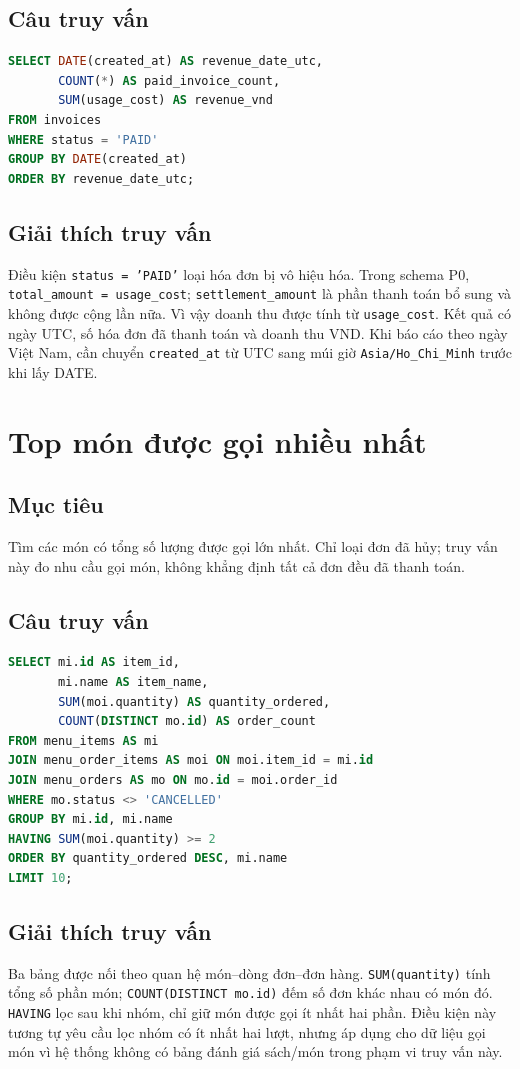 \subsection*{Câu truy vấn}
\begin{lstlisting}[language=SQL]
SELECT DATE(created_at) AS revenue_date_utc,
       COUNT(*) AS paid_invoice_count,
       SUM(usage_cost) AS revenue_vnd
FROM invoices
WHERE status = 'PAID'
GROUP BY DATE(created_at)
ORDER BY revenue_date_utc;
\end{lstlisting}

\subsection*{Giải thích truy vấn}
Điều kiện \texttt{status = 'PAID'} loại hóa đơn bị vô hiệu hóa. Trong schema P0, \texttt{total\_amount = usage\_cost}; \texttt{settlement\_amount} là phần thanh toán bổ sung và không được cộng lần nữa. Vì vậy doanh thu được tính từ \texttt{usage\_cost}. Kết quả có ngày UTC, số hóa đơn đã thanh toán và doanh thu VND. Khi báo cáo theo ngày Việt Nam, cần chuyển \texttt{created\_at} từ UTC sang múi giờ \texttt{Asia/Ho\_Chi\_Minh} trước khi lấy DATE.

\section{Top món được gọi nhiều nhất}
\subsection*{Mục tiêu}
Tìm các món có tổng số lượng được gọi lớn nhất. Chỉ loại đơn đã hủy; truy vấn này đo nhu cầu gọi món, không khẳng định tất cả đơn đều đã thanh toán.

\subsection*{Câu truy vấn}
\begin{lstlisting}[language=SQL]
SELECT mi.id AS item_id,
       mi.name AS item_name,
       SUM(moi.quantity) AS quantity_ordered,
       COUNT(DISTINCT mo.id) AS order_count
FROM menu_items AS mi
JOIN menu_order_items AS moi ON moi.item_id = mi.id
JOIN menu_orders AS mo ON mo.id = moi.order_id
WHERE mo.status <> 'CANCELLED'
GROUP BY mi.id, mi.name
HAVING SUM(moi.quantity) >= 2
ORDER BY quantity_ordered DESC, mi.name
LIMIT 10;
\end{lstlisting}

\subsection*{Giải thích truy vấn}
Ba bảng được nối theo quan hệ món--dòng đơn--đơn hàng. \texttt{SUM(quantity)} tính tổng số phần món; \texttt{COUNT(DISTINCT mo.id)} đếm số đơn khác nhau có món đó. \texttt{HAVING} lọc sau khi nhóm, chỉ giữ món được gọi ít nhất hai phần. Điều kiện này tương tự yêu cầu lọc nhóm có ít nhất hai lượt, nhưng áp dụng cho dữ liệu gọi món vì hệ thống không có bảng đánh giá sách/món trong phạm vi truy vấn này.

